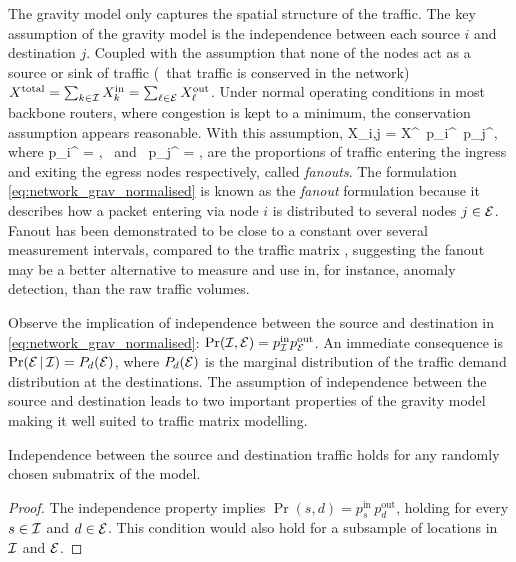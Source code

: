 The gravity model only captures the spatial structure of the
traffic. The key assumption of the gravity model is the independence
between each source $i$ and destination $j$. Coupled with the
assumption that none of the nodes act as a source or sink of traffic
(\ie~that traffic is conserved in the network) $X^{\text{total}} =
\sum_{k \in \mathcal{I}} X_k^{\text{in}} = \sum_{\ell \in \mathcal{E}}
X_\ell^{\text{out}}$. Under normal operating conditions in most
backbone routers, where congestion is kept to a minimum, the
conservation assumption appears reasonable. With this assumption,
\be
X_{i,j} = X^{}\, p_i^{}\, p_j^{},
\label{eq:network_grav_normalised}
\ee
where
\ben
p_i^{} 
    = ,
\quad \mbox{ and } \quad 
p_j^{} 
    = ,
\een
are the proportions of traffic entering the ingress and
exiting the egress nodes respectively, called \textit{fanouts}. The
formulation \autoref{eq:network_grav_normalised} is known as the
\emph{fanout} formulation because it describes how a packet entering
via node $i$ is distributed to several nodes $j \in \mathcal{E}$. Fanout has
been demonstrated to be close to a constant over several measurement
intervals, compared to the traffic matrix \cite{Medina02TMdirections},
suggesting the fanout may be a better alternative to measure and use
in, for instance, anomaly detection, than the raw traffic volumes.

Observe the implication of independence between the source and
destination in \autoref{eq:network_grav_normalised}: $\Pr(\mathcal{I},\mathcal{E}) =
p_{\mathcal{I}}^{\text{in}} p_{\mathcal{E}}^{\text{out}}$. An immediate consequence is
$\Pr(\mathcal{E}\,|\,\mathcal{I}) = P_d(\mathcal{E})$, where $P_d(\mathcal{E})$ is the marginal
distribution of the traffic demand distribution at the
destinations. The assumption of independence between the source and
destination leads to two important properties of the gravity model
making it well suited to traffic matrix modelling.

\begin{thm}[Independence]
  Independence between the source and destination traffic holds for
  any randomly chosen submatrix of the model.
  \label{thm:independence}
\end{thm}
\begin{proof}
  The independence property implies $\Pr(s,d) = p_s^{\text{in}}\,
  p_d^{\text{out}}$, holding for every $s \in \mathcal{I}$ and $d \in \mathcal{E}$.
  This condition would also hold for a subsample of locations in $\mathcal{I}$
  and $\mathcal{E}$.
\end{proof}

